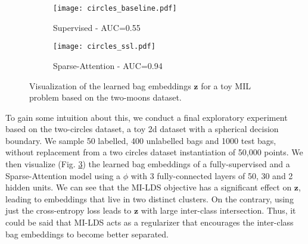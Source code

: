 \documentclass[journal,twoside,web]{ieeecolor}
\begin{document}
\begin{figure}[!ht]
 	\centering
 	 \begin{subfigure}{0.240\textwidth}
 	 	\texttt{[image: circles\_baseline.pdf]}
 	 	\caption{Supervised - AUC=0.55}
 	 	\label{fig:second}
 	 \end{subfigure}
         \hfill
 	 \begin{subfigure}{0.240\textwidth}
 	 	\texttt{[image: circles\_ssl.pdf]}
 	 	\caption{Sparse-Attention - AUC=0.94}
 	 	\label{fig:third}
 	 \end{subfigure}
       
 	\caption{Visualization of the learned bag embeddings $\mathbf{z}$ for
 		a toy MIL problem based on the two-moons dataset.}
 	\label{fig:toy_embeddings}
 \end{figure}


 To gain some intuition about this, 
 we conduct a final exploratory experiment  based on the
 two-circles dataset, a toy 2d dataset with a spherical decision boundary. We
 sample 50 labelled, 400 unlabelled bags and  1000 test bags, without
 replacement from a two circles dataset  instantiation of 50,000 points. We then
 visualize (Fig. \ref{fig:toy_embeddings}) the learned bag embeddings of a
 fully-supervised and a Sparse-Attention model using a $\phi$ with 3
 fully-connected layers of 50, 30 and 2 hidden units. 
 We can see that the MI-LDS objective has a significant effect on
 $\mathbf{z}$,  leading to embeddings that live in two distinct clusters. On the
 contrary, using just the cross-entropy loss leads to $\mathbf{z}$ with large
 inter-class intersection.  Thus, it could be said that MI-LDS
 acts as a regularizer that encourages the inter-class bag embeddings to 
 become better separated.







\end{document}

